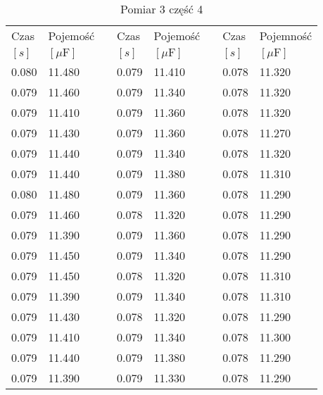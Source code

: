 \documentclass[12pt]{mwrep}
\begin{document}
	\begin{table}[H]\caption{Pomiar 3 część 4}\label{tab:3v4}
		\begin{tabularx}{\textwidth}{|Y|Y|p{2mm}|Y|Y|p{2mm}|Y|Y|}
			Czas & Pojemość && Czas & Pojemość && Czas & Pojemność \\
			$[s]$ & $[\mu\text{F}]$ && $[s]$ & $[\mu\text{F}]$ && $[s]$ & $[\mu\text{F}]$ \\
			0.080 & 11.480 && 0.079 & 11.410 && 0.078 & 11.320 \\
			0.079 & 11.460 && 0.079 & 11.340 && 0.078 & 11.320 \\
			0.079 & 11.410 && 0.079 & 11.360 && 0.078 & 11.320 \\
			0.079 & 11.430 && 0.079 & 11.360 && 0.078 & 11.270 \\
			0.079 & 11.440 && 0.079 & 11.340 && 0.078 & 11.320 \\
			0.079 & 11.440 && 0.079 & 11.380 && 0.078 & 11.310 \\
			0.080 & 11.480 && 0.079 & 11.360 && 0.078 & 11.290 \\
			0.079 & 11.460 && 0.078 & 11.320 && 0.078 & 11.290 \\
			0.079 & 11.390 && 0.079 & 11.360 && 0.078 & 11.290 \\
			0.079 & 11.450 && 0.079 & 11.340 && 0.078 & 11.290 \\
			0.079 & 11.450 && 0.078 & 11.320 && 0.078 & 11.310 \\
			0.079 & 11.390 && 0.079 & 11.340 && 0.078 & 11.310 \\
			0.079 & 11.430 && 0.078 & 11.320 && 0.078 & 11.290 \\
			0.079 & 11.410 && 0.079 & 11.340 && 0.078 & 11.300 \\
			0.079 & 11.440 && 0.079 & 11.380 && 0.078 & 11.290 \\
			0.079 & 11.390 && 0.079 & 11.330 && 0.078 & 11.290 \\

\end{tabularx}
\end{table}
\end{document}
